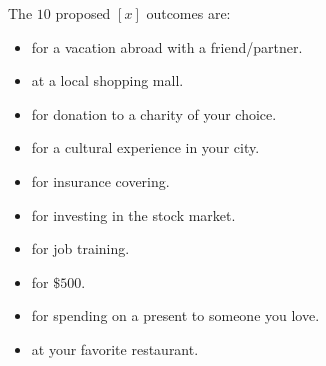 \documentclass[12pt]{article}
\begin{document}
The $10$ proposed $[x]$ outcomes are:
\begin{itemize}
	\item for a vacation abroad with a friend/partner.
	\item at a local shopping mall.
	\item for donation to a charity of your choice.
	\item for a cultural experience in your city.
	\item for insurance covering.
	\item for investing in the stock market.
	\item for job training.
	\item for $\$500$.
	\item for spending on a present to someone you love.
	\item at your favorite restaurant.
\end{itemize}
\end{document}
